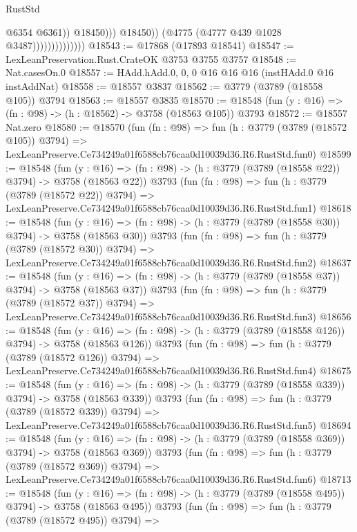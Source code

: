 \begin{lexlean}{RustStd}
\begin{coremodule}
                                          @6354
                                          @6361))
                                      @18450)))
                                @18450))
                            (@4775 (@4777 @439 @1028 @3487))))))))))))))
@18543 := @17868 (@17893 @18541)
@18547 := LexLeanPreservation.Rust.CrateOK @3753 @3755 @3757
@18548 := Nat.casesOn.{0}
@18557 := HAdd.hAdd.{0, 0, 0} @16 @16 @16 (instHAdd.{0} @16 instAddNat)
@18558 := @18557 @3837
@18562 := @3779 (@3789 (@18558 @105)) @3794
@18563 := @18557 @3835
@18570 := @18548 (fun (y : @16) => (fn : @98) -> (h : @18562) -> @3758 (@18563 @105)) @3793
@18572 := @18557 Nat.zero
@18580 := @18570
    (fun (fn : @98) =>
    fun (h : @3779 (@3789 (@18572 @105)) @3794) =>
    LexLeanPreserve.Ce734249a01f6588cb76caa0d10039d36.R6.RustStd.fun0)
@18599 := @18548
    (fun (y : @16) => (fn : @98) -> (h : @3779 (@3789 (@18558 @22)) @3794) -> @3758 (@18563 @22))
    @3793
    (fun (fn : @98) =>
    fun (h : @3779 (@3789 (@18572 @22)) @3794) =>
    LexLeanPreserve.Ce734249a01f6588cb76caa0d10039d36.R6.RustStd.fun1)
@18618 := @18548
    (fun (y : @16) => (fn : @98) -> (h : @3779 (@3789 (@18558 @30)) @3794) -> @3758 (@18563 @30))
    @3793
    (fun (fn : @98) =>
    fun (h : @3779 (@3789 (@18572 @30)) @3794) =>
    LexLeanPreserve.Ce734249a01f6588cb76caa0d10039d36.R6.RustStd.fun2)
@18637 := @18548
    (fun (y : @16) => (fn : @98) -> (h : @3779 (@3789 (@18558 @37)) @3794) -> @3758 (@18563 @37))
    @3793
    (fun (fn : @98) =>
    fun (h : @3779 (@3789 (@18572 @37)) @3794) =>
    LexLeanPreserve.Ce734249a01f6588cb76caa0d10039d36.R6.RustStd.fun3)
@18656 := @18548
    (fun (y : @16) => (fn : @98) -> (h : @3779 (@3789 (@18558 @126)) @3794) -> @3758 (@18563 @126))
    @3793
    (fun (fn : @98) =>
    fun (h : @3779 (@3789 (@18572 @126)) @3794) =>
    LexLeanPreserve.Ce734249a01f6588cb76caa0d10039d36.R6.RustStd.fun4)
@18675 := @18548
    (fun (y : @16) => (fn : @98) -> (h : @3779 (@3789 (@18558 @339)) @3794) -> @3758 (@18563 @339))
    @3793
    (fun (fn : @98) =>
    fun (h : @3779 (@3789 (@18572 @339)) @3794) =>
    LexLeanPreserve.Ce734249a01f6588cb76caa0d10039d36.R6.RustStd.fun5)
@18694 := @18548
    (fun (y : @16) => (fn : @98) -> (h : @3779 (@3789 (@18558 @369)) @3794) -> @3758 (@18563 @369))
    @3793
    (fun (fn : @98) =>
    fun (h : @3779 (@3789 (@18572 @369)) @3794) =>
    LexLeanPreserve.Ce734249a01f6588cb76caa0d10039d36.R6.RustStd.fun6)
@18713 := @18548
    (fun (y : @16) => (fn : @98) -> (h : @3779 (@3789 (@18558 @495)) @3794) -> @3758 (@18563 @495))
    @3793
    (fun (fn : @98) =>
    fun (h : @3779 (@3789 (@18572 @495)) @3794) =>

\end{coremodule}
\end{lexlean}
